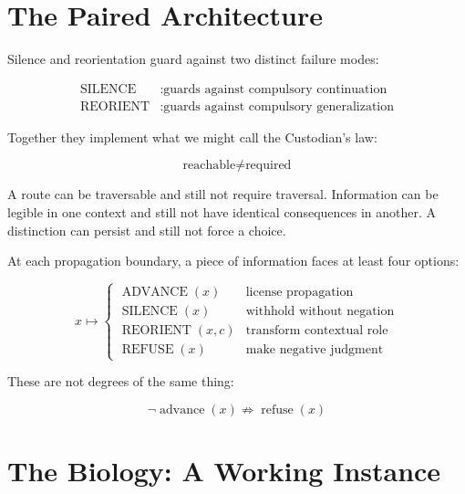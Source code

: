 \documentclass[12pt]{article}
\begin{document}
\section{The Paired Architecture}

Silence and reorientation guard against two distinct failure modes:

\begin{equation}
\begin{aligned}
\operatorname{SILENCE} &: \text{guards against compulsory continuation}\\
\operatorname{REORIENT} &: \text{guards against compulsory generalization}
\end{aligned}
\end{equation}

Together they implement what we might call the Custodian's law:

\begin{equation}
\boxed{\text{reachable} \neq \text{required}}
\end{equation}

A route can be traversable and still not require traversal. Information can be legible in one context and still not have identical consequences in another. A distinction can persist and still not force a choice.

At each propagation boundary, a piece of information faces at least four options:

\begin{equation}
x \longmapsto \begin{cases}
\operatorname{ADVANCE}(x) & \text{license propagation}\\
\operatorname{SILENCE}(x) & \text{withhold without negation}\\
\operatorname{REORIENT}(x, c) & \text{transform contextual role}\\
\operatorname{REFUSE}(x) & \text{make negative judgment}
\end{cases}
\end{equation}

These are not degrees of the same thing:

\begin{equation}
\boxed{\neg \operatorname{advance}(x) \not\Rightarrow \operatorname{refuse}(x)}
\end{equation}

\section{The Biology: A Working Instance}
\end{document}
